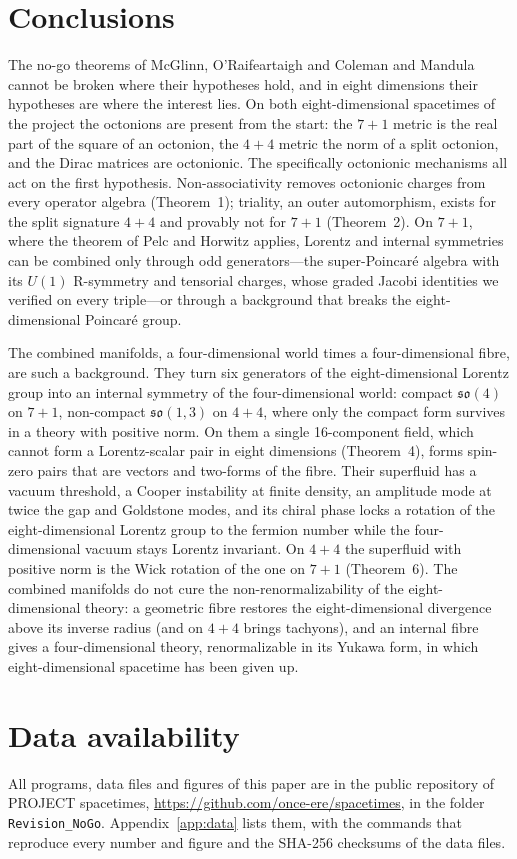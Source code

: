 \section{Conclusions}
\label{sec:conclusions}

The no-go theorems of McGlinn, O'Raifeartaigh and Coleman and Mandula cannot be broken where their
hypotheses hold, and in eight dimensions their hypotheses are where the interest lies. On both
eight-dimensional spacetimes of the project the octonions are present from the start: the $7+1$ metric
is the real part of the square of an octonion, the $4+4$ metric the norm of a split octonion, and the
Dirac matrices are octonionic. The specifically octonionic mechanisms all act on the first hypothesis.
Non-associativity removes octonionic charges from every operator algebra (Theorem~1); triality, an
outer automorphism, exists for the split signature $4+4$ and provably not for $7+1$ (Theorem~2). On
$7+1$, where the theorem of Pelc and Horwitz applies, Lorentz and internal symmetries can be combined
only through odd generators---the super-Poincar\'e algebra with its $U(1)$ R-symmetry and tensorial
charges, whose graded Jacobi identities we verified on every triple---or through a background that
breaks the eight-dimensional Poincar\'e group.

The combined manifolds, a four-dimensional world times a four-dimensional fibre, are such a background.
They turn six generators of the eight-dimensional Lorentz group into an internal symmetry of the
four-dimensional world: compact $\mathfrak{so}(4)$ on $7+1$, non-compact $\mathfrak{so}(1,3)$ on $4+4$, where
only the compact form survives in a theory with positive norm. On them a single 16-component field,
which cannot form a Lorentz-scalar pair in eight dimensions (Theorem~4), forms spin-zero pairs that are
vectors and two-forms of the fibre. Their superfluid has a vacuum threshold, a Cooper instability at
finite density, an amplitude mode at twice the gap and Goldstone modes, and its chiral phase locks a
rotation of the eight-dimensional Lorentz group to the fermion number while the four-dimensional vacuum
stays Lorentz invariant. On $4+4$ the superfluid with positive norm is the Wick rotation of the one on
$7+1$ (Theorem~6). The combined manifolds do not cure the non-renormalizability of the eight-dimensional
theory: a geometric fibre restores the eight-dimensional divergence above its inverse radius (and on
$4+4$ brings tachyons), and an internal fibre gives a four-dimensional theory, renormalizable in its
Yukawa form, in which eight-dimensional spacetime has been given up.

\section*{Data availability}

All programs, data files and figures of this paper are in the public repository of PROJECT
spacetimes, \url{https://github.com/once-ere/spacetimes}, in the folder \texttt{Revision\_NoGo}.
Appendix~\ref{app:data} lists them, with the commands that reproduce every number and figure and the
SHA-256 checksums of the data files.
